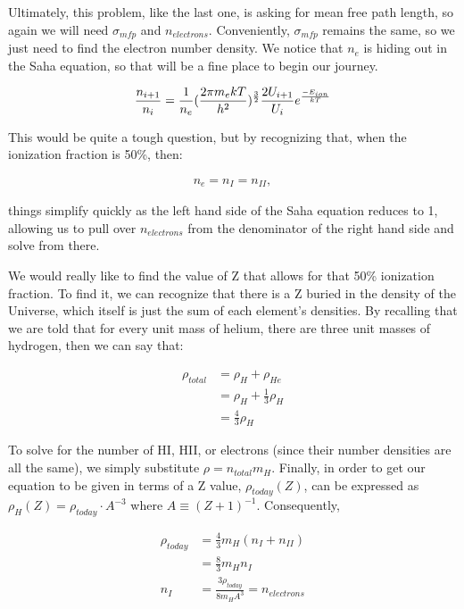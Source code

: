 \documentclass[12pt]{article}
\newenvironment{answer}[2][Answer]{\begin{trivlist}
\item[\hskip \labelsep {\bfseries #1}\hskip \labelsep {\bfseries #2.}]}{\end{trivlist}}
\begin{document}
\begin{answer}{3}


Ultimately, this problem, like the last one, is asking for mean free path length, so again we will need $\sigma_{mfp}$ and $n_{electrons}$. Conveniently, $\sigma_{mfp}$ remains the same, so we just need to find the electron number density. We notice that $n_e$ is hiding out in the Saha equation, so that will be a fine place to begin our journey.

\begin{align*}
  \frac{n_{i+1}}{n_i} = \frac{1}{n_e} (\frac{2 \pi m_e kT}{h^2})^{3 \over 2} \frac{2 U_{i+1}}{U_i} e^{\frac{-E_{ion}}{kT}}
\end{align*}


This would be quite a tough question, but by recognizing that, when the ionization fraction is 50\%, then:

\begin{align*}
  n_e = n_I = n_{II},
\end{align*}


things simplify quickly as the left hand side of the Saha equation reduces to 1, allowing us to pull over $n_{electrons}$ from the denominator of the right hand side and solve from there.

\bigskip


We would really like to find the value of Z that allows for that 50\% ionization fraction. To find it, we can recognize that there is a Z buried in the density of the Universe, which itself is just the sum of each element's densities. By recalling that we are told that for every unit mass of helium, there are three unit masses of hydrogen, then we can say that:

\begin{align*}
  \rho_{total} &= \rho_H + \rho_{He} \\
               &= \rho_H + \frac{1}{3} \rho_H \\
               &= \frac{4}{3} \rho_H
\end{align*}

To solve for the number of HI, HII, or electrons (since their number densities are all the same), we simply substitute $\rho = n_{total} m_H$. Finally, in order to get our equation to be given in terms of a Z value, $\rho_{today}(Z)$, can be expressed as $\rho_H(Z) = \rho_{today} \cdot A^{-3}$ where $A \equiv (Z + 1)^{-1}$. Consequently,

\begin{align*}
  \rho_{today} &= \frac{4}{3} m_H (n_I + n_{II}) \\
               &= \frac{8}{3} m_H n_I \\
  n_I &= \frac{3 \rho_{today}}{8 m_H A^3} = n_{electrons}
\end{align*}


\end{answer}
\end{document}

